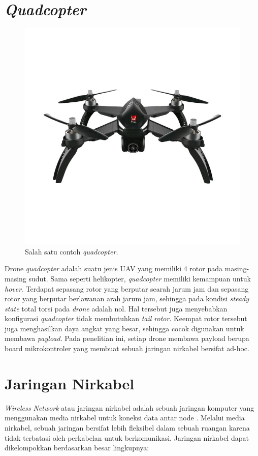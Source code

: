 \section{\textit{Quadcopter}}
\begin{figure}[H]
	\centering
	\includegraphics[scale=0.2]{./assets/MJX}
	\caption{Salah satu contoh \textit{quadcopter.}}
\end{figure}
Drone \textit{quadcopter} adalah suatu jenis UAV yang memiliki 4 rotor pada masing-masing sudut. Sama seperti helikopter, \textit{quadcopter} memiliki kemampuan untuk \textit{hover}. Terdapat sepasang rotor yang berputar searah jarum jam dan sepasang rotor yang berputar berlawanan arah jarum jam, sehingga pada kondisi \textit{steady state} total torsi pada \textit{drone} adalah nol. Hal tersebut juga menyebabkan konfigurasi \textit{quadcopter} tidak membutuhkan \textit{tail rotor}. Keempat rotor tersebut juga menghasilkan daya angkat yang besar, sehingga cocok digunakan untuk membawa \textit{payload}. Pada penelitian ini, setiap drone membawa payload berupa board mikrokontroler yang membuat sebuah jaringan nirkabel bersifat ad-hoc.

\section{Jaringan Nirkabel}
\textit{Wireless Network} atau jaringan nirkabel adalah sebuah jaringan komputer yang menggunakan media nirkabel untuk koneksi data antar node \cite{designing_a_wireless_network}. Melalui media nirkabel, sebuah jaringan bersifat lebih fleksibel dalam sebuah ruangan karena tidak terbatasi oleh perkabelan untuk berkomunikasi. Jaringan nirkabel dapat dikelompokkan berdasarkan besar lingkupnya:
